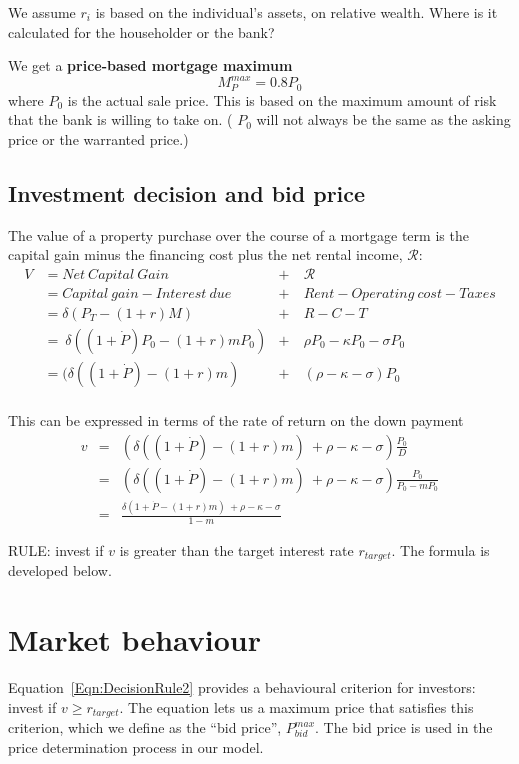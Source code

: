 We assume $r_i$ is based on the individual's assets, on relative wealth. Where is it calculated for the householder or the bank?

We get a \textbf{price-based mortgage maximum} \[M^{max}_P = 0.8P_0\] where $P_0$ is the actual sale price. This is based on the maximum amount of risk that the bank is willing to take on. ( $P_0$  will not always be the same as the asking price or the warranted price.) 

\subsection{Investment decision and bid price}
The value of a property purchase over the course of a mortgage term is the capital gain minus the financing cost plus the net rental income, $\mathcal{R}$:
\begin{align}
V  	&= Net\ Capital\ Gain & +\ & \mathcal{R}\\
    &=  Capital\ gain - Interest\ due      &+\ &   Rent  - Operating\ cost - Taxes  \nonumber \\
    &= \delta(P_T- (1+r)M)             	& +\ & R  	-C  - T \\
    &= \ \delta((1+\dot P)  P_0- (1+r)mP_0)  & +\ & \rho P_0  - \kappa P_0 - \sigma P_0  \nonumber\\
    &= (\delta((1+\dot P)  - (1+r)m)        & +\ & (\rho - \kappa  - \sigma) P_0  \nonumber\\
\end{align}

This can be expressed in terms of the rate of return on the down payment
\begin{eqnarray}
v &=&( \delta((1+\dot P)  - (1+r)m) \    + \rho  - \kappa - \sigma) \frac{P_0}{D}   \nonumber \\
  &=& (\delta((1+\dot P)  - (1+r)m) \    + \rho  - \kappa - \sigma) \frac{P_0}{P_0-mP_0}   \nonumber \\
  &=&\frac{ \delta(1+\dot P  - (1+r)m) \ + \rho  - \kappa - \sigma} {1-m} \label{Eqn:DecisionRule}
\end{eqnarray}

RULE: invest if $v$ is greater than  the  target interest rate $r_{target}$. The formula is developed below.


\section{Market behaviour}
Equation~\ref{Eqn:DecisionRule2} provides a behavioural criterion for investors: invest if $v \geq r_{target}$. The equation lets us a  maximum price that satisfies this criterion, which we define as the ``bid price'', $P^{max}_{bid}$. The bid price is used in the price determination process in our model. 

